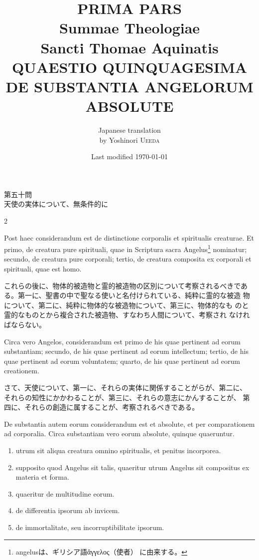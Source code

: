 \documentclass[paper=a4paper,fontsize=10pt,jafontsize=9pt,titlepage]{jlreq}
\title{{\bfseries PRIMA PARS}\\{\Huge Summae Theologiae}\\Sancti Thomae
Aquinatis\\{\sffamily QUAESTIO QUINQUAGESIMA}\\DE SUBSTANTIA ANGELORUM ABSOLUTE}
\author{Japanese translation\\by Yoshinori {\scshape Ueeda}}
\date{Last modified \today}
\begin{document}
\maketitle
\pagestyle{fancy}

\begin{center}
{\Large 第五十問\\天使の実体について、無条件的に}
\end{center}

\begin{paracol}{2}

Post haec considerandum est de distinctione corporalis et spiritualis
creaturae. Et primo, de creatura pure spirituali, quae in Scriptura
sacra Angelus\footnote{angelusは、ギリシア語ἄγγελος（使者）
に由来する。} nominatur; secundo, de creatura pure corporali; tertio,
de creatura composita ex corporali et spirituali, quae est homo.

\switchcolumn

これらの後に、物体的被造物と霊的被造物の区別について考察されるべきであ
 る。第一に、聖書の中で聖なる使いと名付けられている、純粋に霊的な被造
 物について、第二に、純粋に物体的な被造物について、第三に、物体的なも
 のと霊的なものとから複合された被造物、すなわち人間について、考察され
 なければならない。

\switchcolumn*

Circa vero Angelos, considerandum est primo de his quae pertinent ad
eorum substantiam; secundo, de his quae pertinent ad eorum
intellectum; tertio, de his quae pertinent ad eorum voluntatem;
 quarto, de his quae pertinent ad eorum creationem.

\switchcolumn

さて、天使について、第一に、それらの実体に関係することがらが、第二に、
 それらの知性にかかわることが、第三に、それらの意志にかんすることが、
 第四に、それらの創造に属することが、考察されるべきである。

\switchcolumn*

De substantia autem eorum considerandum est et absolute, et per
comparationem ad corporalia. Circa substantiam vero eorum absolute,
quinque quaeruntur.

\begin{enumerate}
 \item utrum sit aliqua creatura omnino spiritualis, et penitus
       incorporea.
 \item supposito quod Angelus sit talis, quaeritur utrum Angelus sit
       compositus ex materia et forma.
 \item quaeritur de multitudine eorum.
 \item de differentia ipsorum ab invicem.
 \item de immortalitate, seu incorruptibilitate ipsorum.
\end{enumerate}


\end{paracol}
\end{document}

